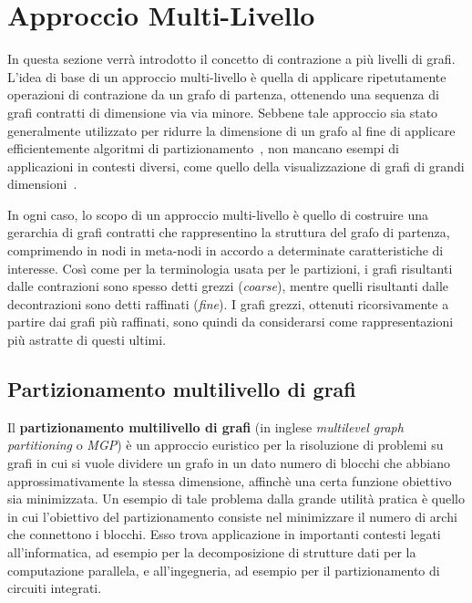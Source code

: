 \section{Approccio Multi-Livello}\label{sec:approccio-multi-livello}
In questa sezione verr\`a introdotto il concetto di contrazione a pi\`u livelli di grafi.
L'idea di base di un approccio multi-livello \`e quella di applicare ripetutamente operazioni di contrazione
da un grafo di partenza, ottenendo una sequenza di grafi contratti di dimensione via via minore.
Sebbene tale approccio sia stato generalmente utilizzato per ridurre la dimensione di un grafo al fine di
applicare efficientemente algoritmi di partizionamento~\cite{DBLP:journals/corr/abs-1012-0006},
non mancano esempi di applicazioni in contesti diversi, come quello della visualizzazione di grafi di grandi
dimensioni~\cite{4069239}.

In ogni caso, lo scopo di un approccio multi-livello \`e quello di costruire una gerarchia di grafi contratti
che rappresentino la struttura del grafo di partenza, comprimendo in nodi in meta-nodi in accordo a determinate
caratteristiche di interesse.
Così come per la terminologia usata per le partizioni, i grafi risultanti dalle contrazioni sono spesso detti
grezzi (\textit{coarse}), mentre quelli risultanti dalle decontrazioni sono detti raffinati (\textit{fine}).
I grafi grezzi, ottenuti ricorsivamente a partire dai grafi pi\`u raffinati, sono quindi da considerarsi
come rappresentazioni pi\`u astratte di questi ultimi. \newline

\subsection{Partizionamento multilivello di grafi}\label{subsec:partizionamento-multilivello-di-grafi}
Il \textbf{partizionamento multilivello di grafi} (in inglese \textit{multilevel graph partitioning} o \textit{MGP})
\`e un approccio euristico per la risoluzione di problemi su grafi in cui si vuole dividere un grafo in un dato numero
di blocchi che abbiano approssimativamente la stessa dimensione, affinch\`e una certa funzione obiettivo sia
minimizzata.
Un esempio di tale problema dalla grande utilità pratica \`e quello in cui l'obiettivo del partizionamento consiste
nel minimizzare il numero di archi che connettono i blocchi.
Esso trova applicazione in importanti contesti legati all'informatica, ad esempio per la decomposizione di strutture
dati per la computazione parallela, e all'ingegneria, ad esempio per il partizionamento di circuiti integrati. \newline

